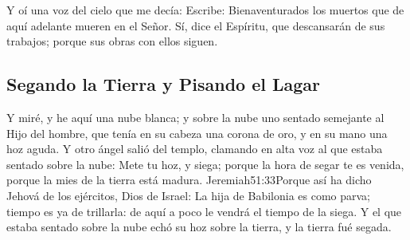 Y oí una voz del cielo que me decía: Escribe: Bienaventurados los muertos que de aquí adelante mueren en el Señor. Sí, dice el Espíritu, que descansarán de sus trabajos; porque sus obras con ellos siguen.
\subsection*{Segando la Tierra y Pisando el Lagar}
Y miré, y he aquí una nube blanca; y sobre la nube uno sentado semejante al Hijo del hombre,%
 que tenía en su cabeza una corona de oro, y en su mano una hoz aguda. 
Y otro ángel salió del templo, clamando en alta voz al que estaba sentado sobre la nube: Mete tu hoz, y siega; porque la hora de segar te es venida, porque la mies de la tierra está madura.%
				  {Jeremiah}{51:33}{Porque así ha dicho Jehová de los ejércitos, Dios de Israel: La hija de Babilonia es como parva; tiempo es ya de trillarla: de aquí a poco le vendrá el tiempo de la siega.}
Y el que estaba sentado sobre la nube echó su hoz sobre la tierra, y la tierra fué segada.

